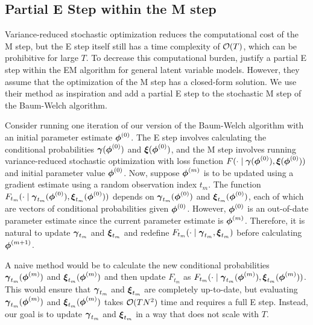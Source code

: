 \subsection{Partial E Step within the M step}
\label{subsec:stoch_E}

Variance-reduced stochastic optimization reduces the computational cost of the M step, but the E step itself still has a time complexity of $\mathcal{O}(T)$, which can be prohibitive for large $T$. To decrease this computational burden, \citet{Neal:1998} justify a partial E step within the EM algorithm for general latent variable models. However, they assume that the optimization of the M step has a closed-form solution. We use their method as inspiration and add a partial E step to the stochastic M step of the Baum-Welch algorithm. 

Consider running one iteration of our version of the Baum-Welch algorithm with an initial parameter estimate $\boldsymbol{\phi}^{(0)}$. The E step involves calculating the conditional probabilities $\boldsymbol{\gamma}(\boldsymbol{\phi}^{(0)})$ and $\boldsymbol{\xi}(\boldsymbol{\phi}^{(0)})$, and the M step involves running variance-reduced stochastic optimization with loss function $F(\cdot \mid \boldsymbol{\gamma}(\boldsymbol{\phi}^{(0)}),\boldsymbol{\xi}(\boldsymbol{\phi}^{(0)}))$ and initial parameter value $\boldsymbol{\phi}^{(0)}$. Now, suppose $\boldsymbol{\phi}^{(m)}$ is to be updated using a gradient estimate using a random observation index $t_m$. The function $F_{t_m}(\cdot \mid \boldsymbol{\gamma}_{t_m}(\boldsymbol{\phi}^{(0)}),\boldsymbol{\xi}_{t_m}(\boldsymbol{\phi}^{(0)}))$ depends on $\boldsymbol{\gamma}_{t_m}(\boldsymbol{\phi}^{(0)})$ and $\boldsymbol{\xi}_{t_m}(\boldsymbol{\phi}^{(0)})$, each of which are vectors of conditional probabilities given $\boldsymbol{\phi}^{(0)}$. However, $\boldsymbol{\phi}^{(0)}$ is an out-of-date parameter estimate since the current parameter estimate is $\boldsymbol{\phi}^{(m)}$. Therefore, it is natural to update $\boldsymbol{\gamma}_{t_m}$ and $\boldsymbol{\xi}_{t_m}$ and redefine $F_{t_m}(\cdot \mid \boldsymbol{\gamma}_{t_m}, \boldsymbol{\xi}_{t_m})$ before calculating $\boldsymbol{\phi}^{(m+1)}$. 

A naive method would be to calculate the new conditional probabilities $\boldsymbol{\gamma}_{t_m}(\boldsymbol{\phi}^{(m)})$ and $\boldsymbol{\xi}_{t_m}(\boldsymbol{\phi}^{(m)})$ and then update $F_{t_m}$ as $F_{t_m}(\cdot \mid \boldsymbol{\gamma}_{t_m}(\boldsymbol{\phi}^{(m)}), \boldsymbol{\xi}_{t_m}(\boldsymbol{\phi}^{(m)}))$. This would ensure that $\boldsymbol{\gamma}_{t_m}$ and $\boldsymbol{\xi}_{t_m}$ are completely up-to-date, but evaluating $\boldsymbol{\gamma}_{t_m}(\boldsymbol{\phi}^{(m)})$ and $\boldsymbol{\xi}_{t_m}(\boldsymbol{\phi}^{(m)})$ takes $\mathcal{O}(TN^2)$ time and requires a full E step. Instead, our goal is to update $\boldsymbol{\gamma}_{t_m}$ and $\boldsymbol{\xi}_{t_m}$ in a way that does not scale with $T$.
%

